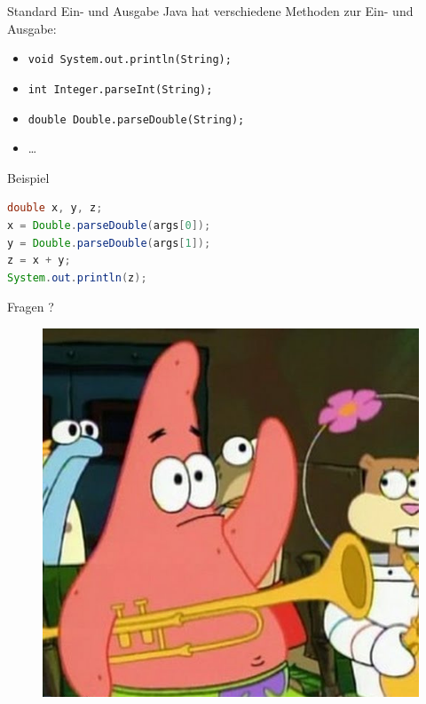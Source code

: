 \documentclass[18pt]{beamer}
\begin{document}
\begin{frame}[fragile]{Standard Ein- und Ausgabe}
    Java hat verschiedene Methoden zur Ein- und Ausgabe:
    \begin{block}{}
        \begin{itemize}
            \item \texttt{void System.out.println(String);}
            \item \texttt{int Integer.parseInt(String);}
            \item \texttt{double Double.parseDouble(String);}
            \item \dots
        \end{itemize}
    \end{block}

    \begin{exampleblock}{Beispiel}
        \begin{lstlisting}[language=Java]
double x, y, z;
x = Double.parseDouble(args[0]);
y = Double.parseDouble(args[1]);
z = x + y;
System.out.println(z);
        \end{lstlisting}
    \end{exampleblock}

\end{frame}

\appendix
\beginbackup

\begin{frame}{Fragen ?}
    \begin{figure}
        \includegraphics[scale=0.3]{img/fragen.jpg}
    \end{figure}
\end{frame}
\end{document}
